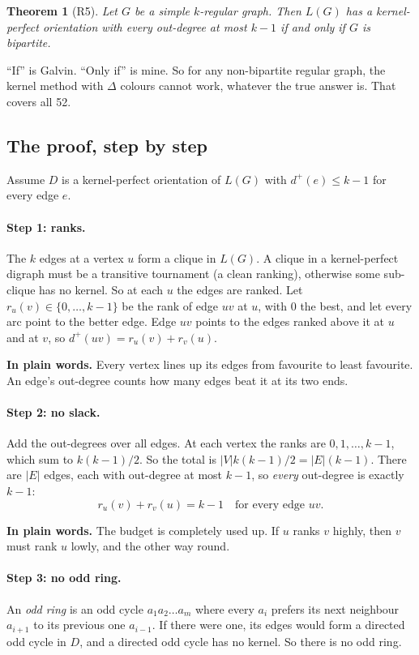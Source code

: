 \documentclass[11pt]{article}
\theoremstyle{plain}
\newtheorem{theorem}{Theorem}
\theoremstyle{definition}
\newcommand{\dout}{d^{+}}
\newcommand{\plain}[1]{\par\smallskip\noindent\colorbox{black!6}{\parbox{\dimexpr\linewidth-2\fboxsep}{\small\textbf{In plain words.} #1}}\par\smallskip}
\begin{document}
\begin{theorem}[R5]
Let $G$ be a simple $k$-regular graph. Then $L(G)$ has a kernel-perfect orientation with every
out-degree at most $k-1$ if and only if $G$ is bipartite.
\end{theorem}

``If'' is Galvin. ``Only if'' is mine. So for any non-bipartite regular graph, the kernel method
with $\Delta$ colours cannot work, whatever the true answer is. That covers all 52.

\subsection{The proof, step by step}

Assume $D$ is a kernel-perfect orientation of $L(G)$ with $\dout(e) \le k-1$ for every edge $e$.

\paragraph{Step 1: ranks.} The $k$ edges at a vertex $u$ form a clique in $L(G)$. A clique in a
kernel-perfect digraph must be a transitive tournament (a clean ranking), otherwise some
sub-clique has no kernel. So at each $u$ the edges are ranked. Let $r_u(v) \in \{0,\dots,k-1\}$
be the rank of edge $uv$ at $u$, with 0 the best, and let every arc point to the better edge.
Edge $uv$ points to the edges ranked above it at $u$ and at $v$, so
$\dout(uv) = r_u(v) + r_v(u)$.

\plain{Every vertex lines up its edges from favourite to least favourite. An edge's
out-degree counts how many edges beat it at its two ends.}

\paragraph{Step 2: no slack.} Add the out-degrees over all edges. At each vertex the ranks are
$0,1,\dots,k-1$, which sum to $k(k-1)/2$. So the total is $|V|k(k-1)/2 = |E|(k-1)$. There are
$|E|$ edges, each with out-degree at most $k-1$, so \emph{every} out-degree is exactly $k-1$:
\[ r_u(v) + r_v(u) = k-1 \quad \text{for every edge } uv. \]

\plain{The budget is completely used up. If $u$ ranks $v$ highly, then $v$ must rank $u$
lowly, and the other way round.}

\paragraph{Step 3: no odd ring.} An \emph{odd ring} is an odd cycle $a_1 a_2 \dots a_m$ where
every $a_i$ prefers its next neighbour $a_{i+1}$ to its previous one $a_{i-1}$. If there were
one, its edges would form a directed odd cycle in $D$, and a directed odd cycle has no kernel.
So there is no odd ring.
\end{document}
